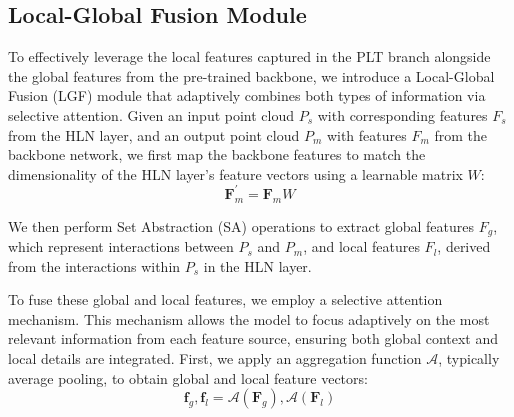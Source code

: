 %
%
%


\subsection{Local-Global Fusion Module}
\label{sec:LGF}
To effectively leverage the local features captured in the PLT branch alongside the global features from the pre-trained backbone, we introduce a Local-Global Fusion (LGF) module that adaptively combines both types of information via selective attention. Given an input point cloud $P_{s}$ with corresponding features $F_{s}$ from the HLN layer, and an output point cloud $P_{m}$ with features $F_{m}$ from the backbone network, we first map the backbone features to match the dimensionality of the HLN layer’s feature vectors using a learnable matrix $W$:
\begin{equation}
	\boldsymbol{F}_{m}^{'} = \boldsymbol{F}_mW 
\end{equation}

We then perform Set Abstraction (SA) operations to extract global features $F_g$, which represent interactions between $P_s$ and $P_m$, and local features $F_l$, derived from the interactions within $P_s$ in the HLN layer.

To fuse these global and local features, we employ a selective attention mechanism. This mechanism allows the model to focus adaptively on the most relevant information from each feature source, ensuring both global context and local details are integrated. First, we apply an aggregation function $\mathcal{A}$, typically average pooling, to obtain global and local feature vectors:
\begin{equation}
	\boldsymbol{f}_g, \boldsymbol{f}_l = \mathcal{A}(\boldsymbol{F}_g),  \mathcal{A}(\boldsymbol{F}_l)
\end{equation}

